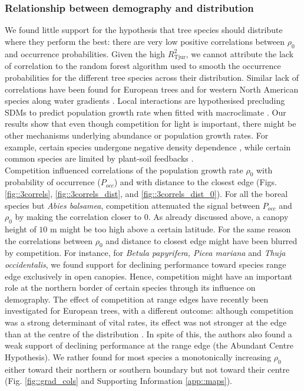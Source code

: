 \subsubsection{Relationship between demography and distribution}
We found little support for the hypothesis that tree species should distribute where they perform the best: there are very low positive correlations between $ \rho_0 $ and occurrence probabilities. Given the high $ R_{\text{Tjur}}^{2} $, we cannot attribute the lack of correlation to the random forest algorithm used to smooth the occurrence probabilities for the different tree species across their distribution. Similar lack of correlations have been found for European trees \citep[using matrix projection models]{Csergo2017} and for western North American species along water gradients \citep{Bohner2019}. Local interactions are hypothesised precluding SDMs to predict population growth rate when fitted with macroclimate \citep{Csergo2017}. Our results show that even though competition for light is important, there might be other mechanisms underlying abundance or population growth rates. For example, certain species undergone negative density dependence \citep[for rare species]{Yenni2012}, while certain common species are limited by plant-soil feedbacks \citep[\textit{Acer saccharum}]{Solarik2019}. \\

Competition influenced correlations of the population growth rate $ \rho_0 $ with probability of occurrence ($ P_{occ} $) and with distance to the closest edge (Figs. \ref{fig::3correls}, \ref{fig::3correls_dist}, and \ref{fig::3correls_dist_0}). For all the boreal species but \textit{Abies balsamea}, competition attenuated the signal between $ P_{occ} $ and $ \rho_0 $ by making the correlation closer to 0. As already discussed above, a canopy height of $ 10 $ m might be too high above a certain latitude. For the same reason the correlations between $ \rho_0 $ and distance to closest edge might have been blurred by competition. For instance, for \textit{Betula papyrifera, Picea mariana} and \textit{Thuja occidentalis}, we found support for declining performance toward species range edge exclusively in open canopies. Hence, competition might have an important role at the northern border of certain species through its influence on demography. The effect of competition at range edges have recently been investigated for European trees, with a different outcome: although competition was a strong determinant of vital rates, its effect was not stronger at the edge than at the centre of the distribution \citep{Kunstler2019}. In spite of this, the authors also found a weak support of declining performance at the range edge (the Abundant Centre Hypothesis). We rather found for most species a monotonically increasing $ \rho_0 $ either toward their northern or southern boundary but not toward their centre (Fig. \ref{fig::grad_cols} and Supporting Information \ref{app::maps}).


